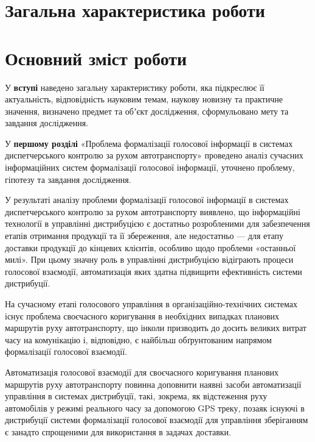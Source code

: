 

\section*{Загальна характеристика роботи}



\section*{Основний зміст роботи}
У \textbf{вступі} наведено загальну характеристику роботи, яка підкреслює її
актуальність, відповідність науковим темам, наукову новизну та практичне
значення, визначено предмет та обʼєкт дослідження, сформульовано мету та завдання
дослідження.

У \textbf{першому розділі} «Проблема формалізації голосової інформації в системах диспетчерського контролю за рухом автотранспорту» проведено аналіз сучасних інформаційних систем формалізації голосової інформації, уточнено проблему, гіпотезу та завдання дослідження.

У результаті аналізу проблеми формалізації голосової інформації в системах диспетчерського контролю за рухом автотранспорту виявлено, що інформаційні технології в управлінні дистрибуцією є достатньо розробленими для забезпечення етапів отримання продукції та її збереження, але недостатньо --- для етапу доставки продукції до кінцевих клієнтів, особливо щодо проблеми «останньої милі». При цьому значну роль в управлінні дистрибуцією відіграють процеси голосової взаємодії, автоматизація яких здатна підвищити ефективність системи дистрибуції.

На сучасному етапі голосового управління в організаційно-технічних системах існує проблема своєчасного коригування в необхідних випадках планових маршрутів руху автотранспорту, що інколи призводить до досить великих витрат часу на комунікацію і, відповідно, є найбільш обґрунтованим напрямом формалізації голосової взаємодії.

Автоматизація голосової взаємодії для своєчасного коригування планових маршрутів руху автотранспорту повинна доповнити наявні засоби автоматизації управління в системах дистрибуції, такі, зокрема, як відстеження руху автомобілів у режимі реального часу за допомогою GPS треку, позаяк існуючі в дистрибуції системи формалізації голосової взаємодії для управління зберіганням є занадто спрощеними для використання в задачах доставки.

